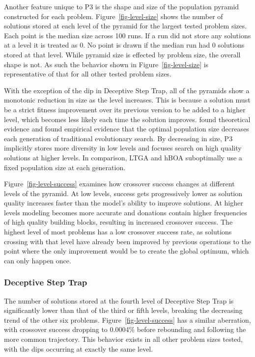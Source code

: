 Another feature unique to P3 is the shape and size of the population pyramid
constructed for each problem. Figure~\ref{fig-level-size} shows the number of solutions stored at
each level of the pyramid for the largest tested problem sizes. Each point is the
median size across 100 runs. If a run did not store any solutions at a level it is treated as 0.
No point is drawn if the median run had 0 solutions stored at that level. While pyramid size
is effected by problem size, the overall shape is not. As such the behavior shown in Figure~\ref{fig-level-size}
is representative of that for all other tested problem sizes.

With the exception of the dip in Deceptive Step Trap, all of the pyramids show a monotonic reduction
in size as the level increases. This is because a solution must be a strict fitness improvement
over its previous version to be added to a higher level, which becomes less likely
each time the solution improves. \cite{lobo:2011:dynamicpop} found theoretical evidence
and \cite{goldman:2011:dynamic-parameters} found empirical evidence that the optimal
population size decreases each generation of traditional evolutionary search.
By decreasing in size, P3 implicitly stores more diversity in low levels and focuses
search on high quality solutions at higher levels. In comparison,
LTGA and hBOA suboptimally use a fixed population size at each generation.

Figure~\ref{fig-level-success} examines how crossover success changes at different
levels of the pyramid. At low levels, success gets progressively lower
as solution quality increases faster than the model's ability to improve solutions.
At higher levels modeling becomes more accurate and donations contain higher frequencies
of high quality building blocks, resulting in increased crossover success. The
highest level of most problems has a low crossover success rate, as solutions
crossing with that level have already been improved by previous operations to
the point where the only improvement would be to create the global optimum, which can
only happen once.

\subsubsection{Deceptive Step Trap}
The number of solutions stored at the fourth level of Deceptive Step Trap is
significantly lower than that of the third or fifth levels, breaking the decreasing
trend of the other six problems. Figure~\ref{fig-level-success} has a similar
aberration, with crossover success dropping to  0.0004\% before rebounding and
following the more common trajectory. This behavior exists in all other problem
sizes tested, with the dips occurring at exactly the same level.

